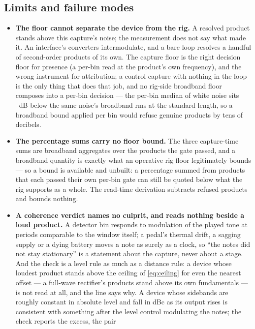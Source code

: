 \documentclass[11pt,a4paper]{article}
\begin{document}
\subsection{Limits and failure modes}
\label{sec:imd-limits}
{\sloppy
\begin{itemize}
  \item \textbf{The floor cannot separate the device from the rig.} A
  resolved product stands above this capture's noise; the measurement
  does not say what made it. An interface's converters intermodulate, and
  a bare loop resolves a handful of second-order products of its own. The
  capture floor is the right decision floor for presence (a per-bin read
  at the product's own frequency), and the wrong instrument for
  attribution; a control capture with nothing in the loop is the only
  thing that does that job, and no rig-side broadband floor composes into
  a per-bin decision --- the per-bin median of white noise sits
  \iparityPerBinLong\ dB below the same noise's broadband rms at the
  standard length, so a broadband bound applied per bin would refuse
  genuine products by tens of decibels.
  \item \textbf{The percentage sums carry no floor bound.} The three
  capture-time sums are broadband aggregates over the products the gate
  passed, and a broadband quantity is exactly what an operative rig floor
  legitimately bounds --- so a bound is available and unbuilt: a
  percentage summed from products that each passed their own per-bin gate
  can still be quoted below what the rig supports as a whole. The
  read-time derivation subtracts refused products and bounds nothing.
  \item \textbf{A coherence verdict names no culprit, and reads nothing
  beside a loud product.} A detector bin responds to modulation of the
  played tone at periods comparable to the window itself; a pedal's
  thermal drift, a sagging supply or a dying battery moves a note as
  surely as a clock, so ``the notes did not stay stationary'' is a
  statement about the capture, never about a stage. And the check is a
  level rule as much as a distance rule: a device whose loudest product
  stands above the ceiling of \eqref{eq:ceiling} for even the nearest
  offset --- a full-wave rectifier's products stand above its own
  fundamentals --- is not read at all, and the line says why. A device
  whose sidebands are roughly constant in absolute level and fall in dBc
  as its output rises is consistent with something after the level
  control modulating the notes; the check reports the excess, the pair

\end{itemize}}
\end{document}
